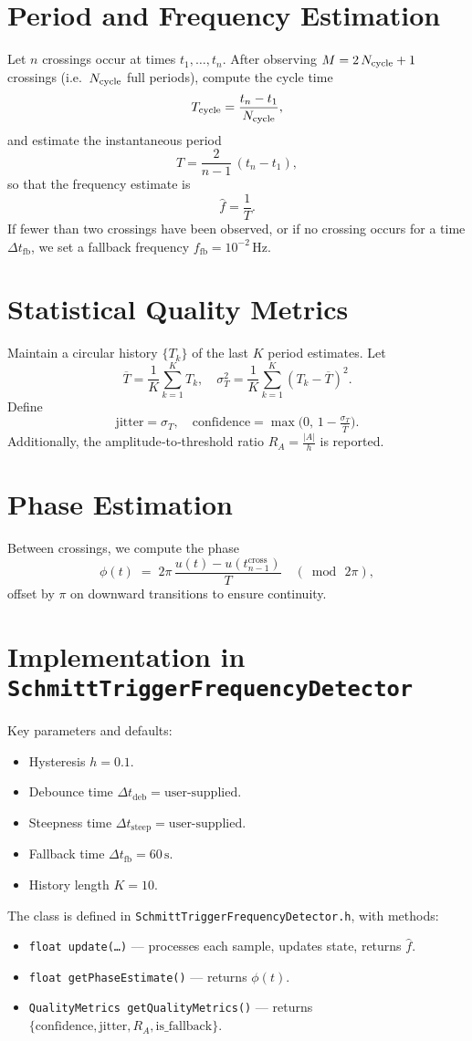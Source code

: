 \documentclass[11pt,letterpaper]{article}
\begin{document}
\section{Period and Frequency Estimation}
Let \(n\) crossings occur at times \(t_1,\dots,t_n\).  After observing \(M=2\,N_{\rm cycle}+1\) crossings (i.e.\ \(N_{\rm cycle}\) full periods), compute the cycle time
\[
T_{\rm cycle}
= \frac{t_{n} - t_{1}}{\,N_{\rm cycle}\,},
\]
and estimate the instantaneous period
\[
T = \frac{2}{n-1}\,(t_{n} - t_{1}),
\]
so that the frequency estimate is
\[
\hat f = \frac{1}{T}.
\]
If fewer than two crossings have been observed, or if no crossing occurs for a time
\(\Delta t_{\mathrm{fb}}\), we set a fallback frequency
\(\displaystyle f_{\mathrm{fb}} = 10^{-2}\,\mathrm{Hz}.\)

\section{Statistical Quality Metrics}
Maintain a circular history \(\{T_k\}\) of the last \(K\) period estimates.  Let
\[
\overline{T} = \frac1K\sum_{k=1}^K T_k,
\quad
\sigma_T^2 = \frac1K\sum_{k=1}^K (T_k-\overline{T})^2.
\]
Define
\[
\text{jitter} = \sigma_T,
\quad
\text{confidence} = \max\bigl(0,\,1 - \tfrac{\sigma_T}{\overline{T}}\bigr).
\]
Additionally, the amplitude‐to‐threshold ratio
\(\displaystyle R_A = \frac{|A|}{h}\) is reported.

\section{Phase Estimation}
Between crossings, we compute the phase
\[
\phi(t) \;=\; 2\pi\,\frac{u(t) - u(t_{n-1}^{\mathrm{cross}})}{T}
\quad (\bmod\,2\pi),
\]
offset by \(\pi\) on downward transitions to ensure continuity.

\section{Implementation in \texttt{SchmittTriggerFrequencyDetector}}
Key parameters and defaults:
\begin{itemize}
  \item Hysteresis \(h=0.1\).
  \item Debounce time \(\Delta t_{\mathrm{deb}}= \text{user‐supplied}\).
  \item Steepness time \(\Delta t_{\mathrm{steep}}= \text{user‐supplied}\).
  \item Fallback time \(\Delta t_{\mathrm{fb}}=60\,\mathrm{s}\).
  \item History length \(K=10\).
\end{itemize}
The class is defined in \texttt{SchmittTriggerFrequencyDetector.h}, with methods:
\begin{itemize}
  \item \texttt{float update(…)} — processes each sample, updates state, returns \(\hat f\).
  \item \texttt{float getPhaseEstimate()} — returns \(\phi(t)\).
  \item \texttt{QualityMetrics getQualityMetrics()} — returns \(\{\mathrm{confidence},\mathrm{jitter},R_A,\mathrm{is\_fallback}\}\).
\end{itemize}
\end{document}
